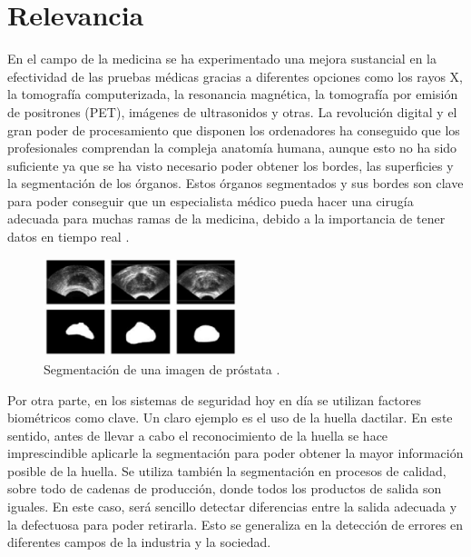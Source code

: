 
\section{Relevancia}\label{sec:relevancia}

En el campo de la medicina \cite{lib:suri, lib:sonka} se ha experimentado una mejora sustancial en la efectividad de las pruebas médicas gracias a diferentes opciones como los rayos X, la tomografía computerizada, la resonancia magnética, la tomografía por emisión de positrones (PET), imágenes de ultrasonidos y otras. La revolución digital y el gran poder de procesamiento que disponen los ordenadores ha conseguido que los profesionales comprendan la compleja anatomía humana, aunque esto no ha sido suficiente ya que se ha visto necesario poder obtener los bordes, las superficies y la segmentación de los órganos. Estos órganos segmentados y sus bordes son clave para poder conseguir que un especialista médico pueda hacer una cirugía adecuada para muchas ramas de la medicina, debido a la importancia de tener datos en tiempo real \cite{url:noticiasegmentacion}. %
\begin{figure}
\centering
	\includegraphics[width=0.5\textwidth]{img/imagenmedica.eps}
	\caption{Segmentación de una imagen de próstata \cite{art:bustincesegmedica}.}
	\label{img:segmentacionmedica}
\end{figure}


Por otra parte, en los sistemas de seguridad hoy en día se utilizan factores biométricos como clave. Un claro ejemplo es el uso de la huella dactilar. En este sentido, antes de llevar a cabo el reconocimiento de la huella se hace imprescindible aplicarle la segmentación para poder obtener la mayor información posible de la huella. Se utiliza también la segmentación en procesos de calidad, sobre todo de cadenas de producción, donde todos los productos de salida son iguales. En este caso, será sencillo detectar diferencias entre la salida adecuada y la defectuosa para poder retirarla. Esto se generaliza en la detección de errores en diferentes campos de la industria y la sociedad.

